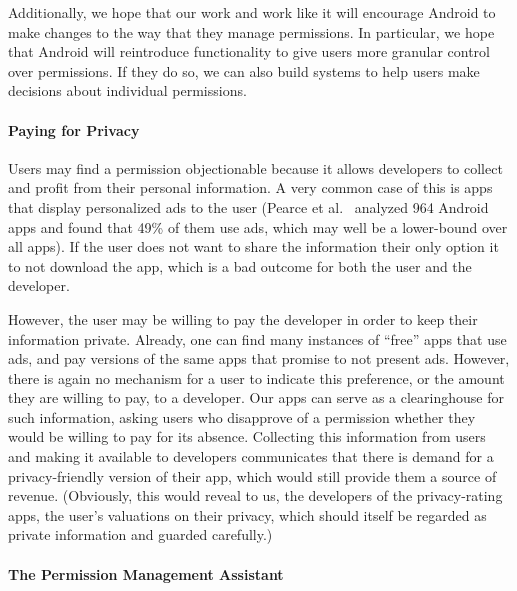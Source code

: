 \documentclass[11pt]{article}
\begin{document}
Additionally, we hope that our work and work like it will encourage Android to
make changes to the way that they manage permissions. In particular, we hope that 
Android will reintroduce functionality to give users more granular control over 
permissions. If they do so, we can also build systems to help users make decisions
about individual permissions.

\paragraph{Paying for Privacy}

Users may find a permission objectionable because it allows developers
to collect and profit from their personal information. A very common
case of this is apps that display personalized ads to the user (Pearce et al.\
\cite{addroid-ASIACCS12} analyzed 964 Android apps and found that 49\% 
of them use ads, which may well be a lower-bound over all apps).  If
the user does not want to share the information their only option it
to not download the app, which is a bad outcome for both the user and
the developer. 

However, the user may be willing to pay the developer in order to keep
their information private. Already, one can find many instances of
``free'' apps that use ads, and pay versions of the same apps that
promise to not present ads. However, there is again no mechanism for a
user to indicate this preference, or the amount they are willing to
pay, to a developer. Our apps can serve as a clearinghouse for such
information, asking users who disapprove of a permission whether they
would be willing to pay for its absence. Collecting this information
from users and making it available to developers communicates that
there is demand for a privacy-friendly version of their app, which
would still provide them a source of revenue. (Obviously, this would
reveal to us, the developers of the privacy-rating apps, the user's
valuations on their privacy, which should itself be regarded as
private information and guarded carefully.)

\paragraph{The Permission Management Assistant}
\label{subsubsec-perm-man-asst}
\end{document}
